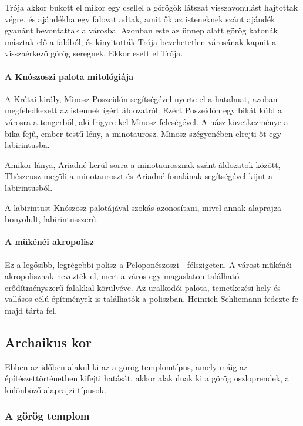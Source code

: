 Trója akkor bukott el mikor egy csellel a görögök látszat visszavonulást hajtottak végre, és ajándékba egy falovat adtak, amit ők az isteneknek szánt ajándék gyanánt bevontattak a városba. Azonban este az ünnep alatt görög katonák másztak elő a falóból, és kinyitották Trója bevehetetlen városának kapuit a visszaérkező görög seregnek. Ekkor esett el Trója.

\paragraph{A Knószoszi palota mitológiája}
A Krétai király, Minosz Poszeidón segítségével nyerte el a hatalmat, azoban megfeledkezett az istennek ígért áldozatról. Ezért Poszeidón egy bikát küld a városra a tengerből, aki frigyre kel Minosz feleségével. A nász következménye a bika fejű, ember testű lény, a minotaurosz. Minosz szégyenében elrejti őt egy labirintusba.

Amikor lánya, Ariadné kerül sorra a minotaurosznak szánt áldozatok között, Thészeusz megöli a minotauroszt és Ariadné fonalának segítségével kijut a labirintusból.

A labirintust Knószosz palotájával szokás azonosítani, mivel annak alaprajza bonyolult, labirintusszerű.

\paragraph{A mükénéi akropolisz}
Ez a legősibb, legrégebbi polisz a Peloponészoszi - félszigeten. A várost műkénéi akropolisznak nevezték el, mert a város egy magaslaton található erődítményszerű falakkal körülvéve. Az uralkodói palota, temetkezési hely és vallásos célú építmények is találhatók a poliszban. Heinrich Schliemann fedezte fe majd tárta fel.

\clearpage

\subsection*{Archaikus kor}

Ebben az időben alakul ki az a görög templomtípus, amely máig az építészettörténetben kifejti hatását, akkor alakulnak ki a görög oszloprendek, a különböző alaprajzi típusok.

\subsubsection{A görög templom}


